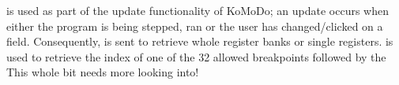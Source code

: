 %
 is used as part of the update functionality of KoMoDo; an update occurs when either the program is being stepped, ran or the user has changed/clicked on a field. Consequently,  is sent to retrieve whole register banks or single registers.
%
%
%
%
 is used to retrieve the index of one of the 32 allowed breakpoints followed by the
This whole bit needs more looking into!
%
%
%
%
%
%
%
%


